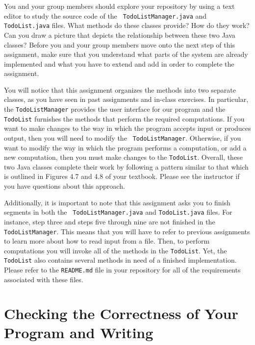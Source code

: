\documentclass[11pt]{article}
\newcommand{\mainprogram}{\lstinline{TodoListManager}}
\newcommand{\secondprogram}{\lstinline{TodoList}}
\newcommand{\readme}{\lstinline{README.md}}
\begin{document}
You and your group members should explore your repository by using a text editor to study the source code of the {\tt
TodoListManager.java} and {\tt TodoList.java} files. What methods do these classes provide? How do they
work? Can you draw a picture that depicts the relationship between these two Java classes? Before you and your group
members move onto the next step of this assignment, make sure that you understand what parts of the system are already
implemented and what you have to extend and add in order to complete the assignment.

You will notice that this assignment organizes the methods into two separate classes, as you have seen in past
assignments and in-class exercises. In particular, the {\tt TodoListManager} provides the user interface for our
program and the {\tt TodoList} furnishes the methods that perform the required computations. If you want to
make changes to the way in which the program accepts input or produces output, then you will need to modify the {\tt
TodoListManager}. Otherwise, if you want to modify the way in which the program performs a computation, or add a
new computation, then you must make changes to the {\tt TodoList}. Overall, these two Java classes complete
their work by following a pattern similar to that which is outlined in Figures 4.7 and 4.8 of your textbook. Please see
the instructor if you have questions about this approach.

Additionally, it is important to note that this assignment asks you to finish segments in both the {\tt
TodoListManager.java} and {\tt TodoList.java} files. For instance, step three and steps five through
nine are not finished in the \mainprogram{}. This means that you will have to refer to previous assignments to learn
more about how to read input from a file. Then, to perform computations you will invoke all of the methods in the
\secondprogram{}. Yet, the \secondprogram{} also contains several methods in need of a finished implementation. Please
refer to the \readme{} file in your repository for all of the requirements associated with these files.

\section*{Checking the Correctness of Your Program and Writing}
\end{document}
